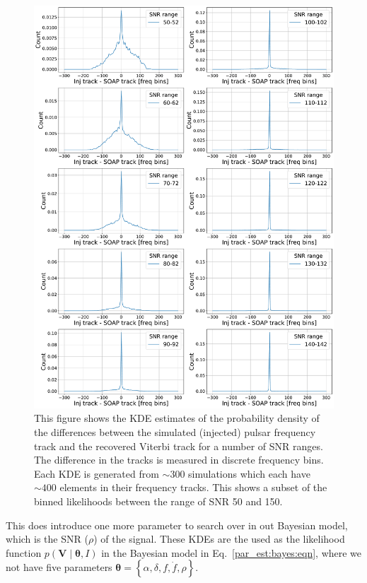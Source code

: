 \begin{figure}[hpt]

    \centering
    \includegraphics[width=\linewidth]{C5_parameter/KDE_range_50_100.pdf}
    \caption[KDE of likelihood in different \gls{SNR} ranges]{This figure shows the \gls{KDE} estimates of the probability density of the differences between the simulated (injected) pulsar frequency track and the recovered Viterbi track for a number of \gls{SNR} ranges. The difference in the tracks is measured in discrete frequency bins. Each \gls{KDE} is generated from $\sim 300$ simulations which each have $\sim 400$ elements in their frequency tracks. This shows a subset of the binned likelihoods between the range of \gls{SNR} 50 and 150.}
    \label{par_est:bayes:likelihood:kde142}
    
    \end{figure}
%

This does introduce one more parameter to search over in out Bayesian model, which is the \gls{SNR} ($\rho$) of the signal.
These \glspl{KDE} are the used as the likelihood function $p(\bm{V} \mid \bm{\theta}, I)$ in the Bayesian model in Eq.~\ref{par_est:bayes:eqn}, where we not have five parameters $\bm{\theta} = \left\{\alpha, \delta, f, \dot{f} , \rho \right\}$.


